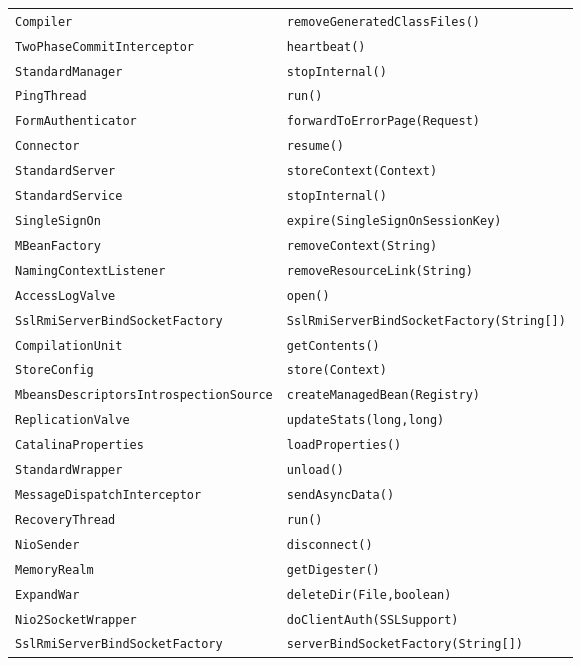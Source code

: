 \begin{center}
\begin{longtable}{ll}
\lstinline/Compiler/&{\lstinline/removeGeneratedClassFiles()/}\\
\lstinline/TwoPhaseCommitInterceptor/&{\lstinline/heartbeat()/}\\
\lstinline/StandardManager/&{\lstinline/stopInternal()/}\\
\lstinline/PingThread/&{\lstinline/run()/}\\
\lstinline/FormAuthenticator/&{\lstinline/forwardToErrorPage(Request)/}\\
\lstinline/Connector/&{\lstinline/resume()/}\\
\lstinline/StandardServer/&{\lstinline/storeContext(Context)/}\\
\lstinline/StandardService/&{\lstinline/stopInternal()/}\\
\lstinline/SingleSignOn/&{\lstinline/expire(SingleSignOnSessionKey)/}\\
\lstinline/MBeanFactory/&{\lstinline/removeContext(String)/}\\
\lstinline/NamingContextListener/&{\lstinline/removeResourceLink(String)/}\\
\lstinline/AccessLogValve/&{\lstinline/open()/}\\
\lstinline/SslRmiServerBindSocketFactory/&{\lstinline/SslRmiServerBindSocketFactory(String[])/}\\
\lstinline/CompilationUnit/&{\lstinline/getContents()/}\\
\lstinline/StoreConfig/&{\lstinline/store(Context)/}\\
\lstinline/MbeansDescriptorsIntrospectionSource/&{\lstinline/createManagedBean(Registry)/}\\
\lstinline/ReplicationValve/&{\lstinline/updateStats(long,long)/}\\
\lstinline/CatalinaProperties/&{\lstinline/loadProperties()/}\\
\lstinline/StandardWrapper/&{\lstinline/unload()/}\\
\lstinline/MessageDispatchInterceptor/&{\lstinline/sendAsyncData()/}\\
\lstinline/RecoveryThread/&{\lstinline/run()/}\\
\lstinline/NioSender/&{\lstinline/disconnect()/}\\
\lstinline/MemoryRealm/&{\lstinline/getDigester()/}\\
\lstinline/ExpandWar/&{\lstinline/deleteDir(File,boolean)/}\\
\lstinline/Nio2SocketWrapper/&{\lstinline/doClientAuth(SSLSupport)/}\\
\lstinline/SslRmiServerBindSocketFactory/&{\lstinline/serverBindSocketFactory(String[])/}\\

\end{longtable}
\end{center}
